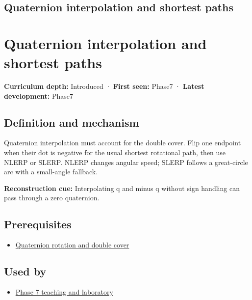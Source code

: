 \hypertarget{appendix-9b4b8254f26b}{}
\section*{Quaternion interpolation and shortest paths}
\chapter{Quaternion interpolation and shortest paths}\label{appendix-9b4b8254f26b-quaternion-interpolation-and-shortest-paths}

\textbf{Curriculum depth:} Introduced · \textbf{First seen:} Phase7 · \textbf{Latest development:} Phase7

\section{Definition and mechanism}\label{appendix-9b4b8254f26b-definition-and-mechanism}

Quaternion interpolation must account for the double cover. Flip one endpoint when their dot is negative for the usual shortest rotational path, then use NLERP or SLERP. NLERP changes angular speed; SLERP follows a great-circle arc with a small-angle fallback.

\textbf{Reconstruction cue:} Interpolating q and minus q without sign handling can pass through a zero quaternion.

\section{Prerequisites}\label{appendix-9b4b8254f26b-prerequisites}

\begin{itemize}
\tightlist
\item
  \hyperref[appendix-8e61ab68f6b2]{Quaternion rotation and double cover}
\end{itemize}

\section{Used by}\label{appendix-9b4b8254f26b-used-by}

\begin{itemize}
\tightlist
\item
  \href{Continuous\%20Notes/Computing\%20Foundations\%20-\%20From\%20Bits\%20to\%20C++\%20and\%20Systems\%20APIs\#Keep\%20the\%20promises\%20visible\%20while\%20moving\%20between\%20representations}{Phase 7 teaching and laboratory}
\end{itemize}

